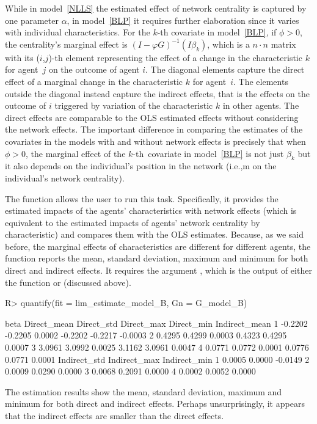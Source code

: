 \documentclass[nojss]{jss}
\begin{document}
While in model~\ref{NLLS} the estimated effect of network centrality is captured by one parameter $\alpha$, in model~\ref{BLP} it requires further elaboration since it varies with individual characteristics. For the $k$-th covariate in model~\ref{BLP}, if $\phi >0$, the centrality's marginal effect is $(I-\varphi G)^{-1}(I\beta _{k})$, which is a $n\cdot n$ matrix with its ($i$,$j$)-th element representing the effect of a change in the characteristic $k$ for agent $\,j$ on the outcome
of agent $i.$ The diagonal elements capture the direct effect of a marginal change in the characteristic $k$ for agent $\,i.$ The elements outside the diagonal instead capture the indirect effects, that is the effects on the outcome of $i$ triggered by variation of the characteristic $k$ in other agents. The direct effects are comparable to the OLS estimated effects without considering the network effects. The important difference in comparing the estimates of the covariates in the models with
and without network effects is precisely that when $\phi>0$, the marginal effect of the $k$-th\ covariate in model~\ref{BLP} is not just $\beta_{k}$ but it also depends on the individual's position in the network (i.e.,m on the individual's network centrality).

The function  allows the user to run this task.
Specifically, it provides the estimated impacts of the agents'
characteristics with network effects (which is equivalent to the estimated impacts of agents' network centrality by characteristic) and compares them with the OLS estimates. Because, as we said before, the marginal effects of characteristics are different for different agents, the function  reports the mean, standard deviation, maximum and minimum for both direct and indirect effects. It
requires the argument , which is the output of either the function  or  (discussed above).
\begin{CodeChunk}
\begin{CodeInput}
R> quantify(fit = lim_estimate_model_B, Gn = G_model_B)
\end{CodeInput}
\begin{CodeOutput}
beta Direct_mean Direct_std Direct_max Direct_min Indirect_mean
1 -0.2202     -0.2205     0.0002    -0.2202    -0.2217       -0.0003
2  0.4295      0.4299     0.0003     0.4323     0.4295        0.0007
3  3.0961      3.0992     0.0025     3.1162     3.0961        0.0047
4  0.0771      0.0772     0.0001     0.0776     0.0771        0.0001
Indirect_std Indirect_max Indirect_min
1       0.0005       0.0000      -0.0149
2       0.0009       0.0290       0.0000
3       0.0068       0.2091       0.0000
4       0.0002       0.0052       0.0000
\end{CodeOutput}
\end{CodeChunk}
The estimation results show the mean, standard deviation, maximum and minimum for both direct and indirect effects. Perhaps unsurprisingly, it appears that the indirect effects are smaller than the direct effects.
\end{document}
